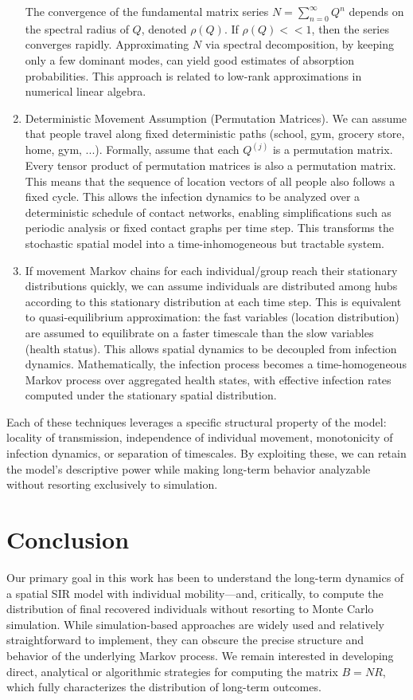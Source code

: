 \documentclass[a4paper]{article}
\begin{document}
\begin{enumerate}
		The convergence of the fundamental matrix series $N=\sum_{n=0}^\infty Q^n$ depends on the spectral radius of $Q$, denoted $\rho(Q)$. If $\rho(Q)<< 1$, then the series converges rapidly. Approximating $N$ via spectral decomposition, by keeping only a few dominant modes, can yield good estimates of absorption probabilities. This approach is related to low-rank approximations in numerical linear algebra.
		
		\item Deterministic Movement Assumption (Permutation Matrices). We can assume that people travel along fixed deterministic paths (school, gym, grocery store, home, gym, ...). Formally, assume that each $Q^{(j)}$ is a permutation matrix. Every tensor product of permutation matrices is also a permutation matrix. This means that the sequence of location vectors of all people also follows a fixed cycle. This allows the infection dynamics to be analyzed over a deterministic schedule of contact networks, enabling simplifications such as periodic analysis or fixed contact graphs per time step. This transforms the stochastic spatial model into a time-inhomogeneous but tractable system.
		
		\item If movement Markov chains for each individual/group reach their stationary distributions quickly, we can assume individuals are distributed among hubs according to this stationary distribution at each time step. This is equivalent to quasi-equilibrium approximation: the fast variables (location distribution) are assumed to equilibrate on a faster timescale than the slow variables (health status). This allows spatial dynamics to be decoupled from infection dynamics. Mathematically, the infection process becomes a time-homogeneous Markov process over aggregated health states, with effective infection rates computed under the stationary spatial distribution.
	\end{enumerate}
	
	Each of these techniques leverages a specific structural property of the model: locality of transmission, independence of individual movement, monotonicity of infection dynamics, or separation of timescales. By exploiting these, we can retain the model’s descriptive power while making long-term behavior analyzable without resorting exclusively to simulation.
	
	
	\section{Conclusion}
	Our primary goal in this work has been to understand the long-term dynamics of a spatial SIR model with individual mobility—and, critically, to compute the distribution of final recovered individuals without resorting to Monte Carlo simulation. While simulation-based approaches are widely used and relatively straightforward to implement, they can obscure the precise structure and behavior of the underlying Markov process. We remain interested in developing direct, analytical or algorithmic strategies for computing the matrix $B=NR$, which fully characterizes the distribution of long-term outcomes.
	
\end{document}
